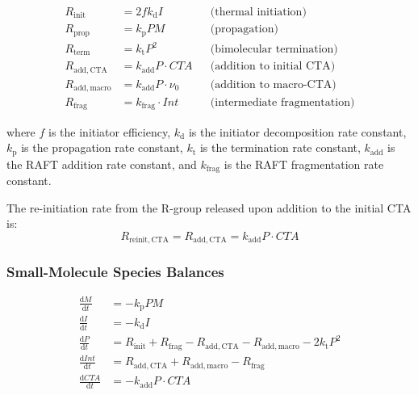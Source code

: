 \documentclass[journal=mamobx,manuscript=suppinfo]{achemso}
\begin{document}
\begin{align}
  R_{\mathrm{init}}     &= 2 f k_{\mathrm{d}} I
    & &\text{(thermal initiation)} \label{eq:R_init} \\
  R_{\mathrm{prop}}     &= k_{\mathrm{p}} P M
    & &\text{(propagation)} \label{eq:R_prop} \\
  R_{\mathrm{term}}     &= k_{\mathrm{t}} P^2
    & &\text{(bimolecular termination)} \label{eq:R_term} \\
  R_{\mathrm{add,CTA}}  &= k_{\mathrm{add}} P \cdot \mathit{CTA}
    & &\text{(addition to initial CTA)} \label{eq:R_add_cta} \\
  R_{\mathrm{add,macro}} &= k_{\mathrm{add}} P \cdot \nu_0
    & &\text{(addition to macro-CTA)} \label{eq:R_add_macro} \\
  R_{\mathrm{frag}}     &= k_{\mathrm{frag}} \cdot \mathit{Int}
    & &\text{(intermediate fragmentation)} \label{eq:R_frag}
\end{align}

\noindent where $f$ is the initiator efficiency, $k_{\mathrm{d}}$ is the
initiator decomposition rate constant, $k_{\mathrm{p}}$ is the propagation
rate constant, $k_{\mathrm{t}}$ is the termination rate constant,
$k_{\mathrm{add}}$ is the RAFT addition rate constant, and
$k_{\mathrm{frag}}$ is the RAFT fragmentation rate constant.

The re-initiation rate from the R-group released upon addition to the initial
CTA is:
\begin{equation}
  R_{\mathrm{reinit,CTA}} = R_{\mathrm{add,CTA}} = k_{\mathrm{add}} P \cdot \mathit{CTA}
  \label{eq:R_reinit}
\end{equation}

\subsubsection{Small-Molecule Species Balances}

\begin{align}
  \frac{\mathrm{d}M}{\mathrm{d}t}
    &= -k_{\mathrm{p}} P M
    \label{eq:dM} \\[6pt]
  \frac{\mathrm{d}I}{\mathrm{d}t}
    &= -k_{\mathrm{d}} I
    \label{eq:dI} \\[6pt]
  \frac{\mathrm{d}P}{\mathrm{d}t}
    &= R_{\mathrm{init}} + R_{\mathrm{frag}}
       - R_{\mathrm{add,CTA}} - R_{\mathrm{add,macro}}
       - 2 k_{\mathrm{t}} P^2
    \label{eq:dP} \\[6pt]
  \frac{\mathrm{d}\mathit{Int}}{\mathrm{d}t}
    &= R_{\mathrm{add,CTA}} + R_{\mathrm{add,macro}} - R_{\mathrm{frag}}
    \label{eq:dInt} \\[6pt]
  \frac{\mathrm{d}\mathit{CTA}}{\mathrm{d}t}
    &= -k_{\mathrm{add}} P \cdot \mathit{CTA}
    \label{eq:dCTA}
\end{align}
\end{document}
